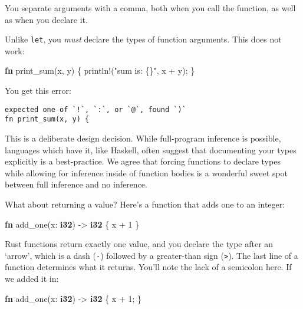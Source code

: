 \documentclass[a4paper,]{book}
\newenvironment{Shaded}{\begin{snugshade}}{\end{snugshade}}
\newcommand{\KeywordTok}[1]{\textcolor[rgb]{0.13,0.29,0.53}{\textbf{{#1}}}}
\newcommand{\DecValTok}[1]{\textcolor[rgb]{0.00,0.00,0.81}{{#1}}}
\newcommand{\StringTok}[1]{\textcolor[rgb]{0.31,0.60,0.02}{{#1}}}
\newcommand{\OtherTok}[1]{\textcolor[rgb]{0.56,0.35,0.01}{{#1}}}
\newcommand{\NormalTok}[1]{{#1}}
\begin{document}
You separate arguments with a comma, both when you call the function, as
well as when you declare it.

Unlike \texttt{let}, you \emph{must} declare the types of function
arguments. This does not work:

\begin{Shaded}
\begin{Highlighting}[]
\KeywordTok{fn} \NormalTok{print_sum(x, y) \{}
    \OtherTok{println!}\NormalTok{(}\StringTok{"sum is: \{\}"}\NormalTok{, x + y);}
\NormalTok{\}}
\end{Highlighting}
\end{Shaded}

You get this error:

\begin{verbatim}
expected one of `!`, `:`, or `@`, found `)`
fn print_sum(x, y) {
\end{verbatim}

This is a deliberate design decision. While full-program inference is
possible, languages which have it, like Haskell, often suggest that
documenting your types explicitly is a best-practice. We agree that
forcing functions to declare types while allowing for inference inside
of function bodies is a wonderful sweet spot between full inference and
no inference.

What about returning a value? Here's a function that adds one to an
integer:

\begin{Shaded}
\begin{Highlighting}[]
\KeywordTok{fn} \NormalTok{add_one(x: }\KeywordTok{i32}\NormalTok{) -> }\KeywordTok{i32} \NormalTok{\{}
    \NormalTok{x + }\DecValTok{1}
\NormalTok{\}}
\end{Highlighting}
\end{Shaded}

Rust functions return exactly one value, and you declare the type after
an `arrow', which is a dash (\texttt{-}) followed by a greater-than sign
(\texttt{\textgreater{}}). The last line of a function determines what
it returns. You'll note the lack of a semicolon here. If we added it in:

\begin{Shaded}
\begin{Highlighting}[]
\KeywordTok{fn} \NormalTok{add_one(x: }\KeywordTok{i32}\NormalTok{) -> }\KeywordTok{i32} \NormalTok{\{}
    \NormalTok{x + }\DecValTok{1}\NormalTok{;}
\NormalTok{\}}
\end{Highlighting}
\end{Shaded}
\end{document}
